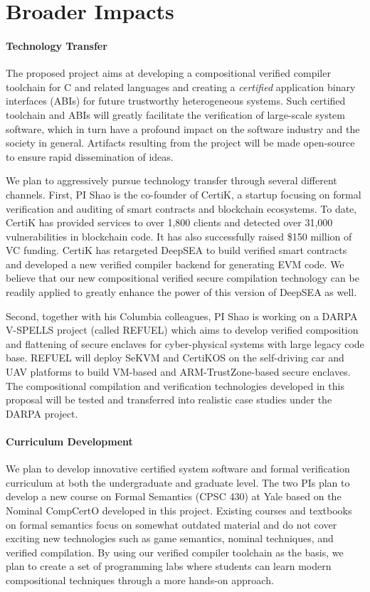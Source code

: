 \section{Broader Impacts}
\label{sec:impact}

\paragraph*{Technology Transfer}
The proposed project aims at developing a compositional verified
compiler toolchain for C and related languages and creating a {\em
  certified} application binary interfaces (ABIs) for future
trustworthy heterogeneous systems. Such certified toolchain and ABIs
will greatly facilitate the verification of large-scale system
software, which in turn have a profound impact on the software
industry and the society in general.
Artifacts resulting from the project will be
made open-source to ensure rapid dissemination of ideas.

We plan to aggressively pursue technology transfer through several
different channels. First, PI Shao is the co-founder of CertiK,
a startup focusing on formal verification and auditing of smart
contracts and blockchain ecosystems. To date,
CertiK has provided services to over 1,800 clients and detected
over 31,000 vulnerabilities in blockchain code. It has also
successfully raised \$150 million of VC funding. CertiK has retargeted
DeepSEA to build verified smart contracts and developed a new
verified compiler backend for generating EVM code. We believe
that our new compositional verified secure compilation technology
can be readily applied to greatly enhance the power of this version
of DeepSEA as well.

Second, together with his Columbia colleagues, PI Shao is working on
a DARPA V-SPELLS project (called REFUEL)
which aims to develop verified composition and flattening of secure
enclaves for cyber-physical systems with large legacy code base.
REFUEL will deploy SeKVM and CertiKOS on the self-driving car
and UAV platforms to build VM-based and ARM-TrustZone-based secure
enclaves. The compositional compilation and verification technologies
developed in this proposal will be tested and transferred into realistic
case studies under the DARPA project.

\vspace*{-2ex}
\paragraph*{Curriculum Development}
We plan to develop innovative certified system software and formal
verification curriculum at both the undergraduate and graduate
level. The two PIs plan to develop a new course on Formal Semantics
(CPSC 430) at Yale based on the Nominal CompCertO developed in this
project. Existing courses and textbooks on formal semantics focus on
somewhat outdated material and do not cover exciting new technologies
such as game semantics, nominal techniques, and verified
compilation. By using our verified compiler toolchain as the basis, we
plan to create a set of programming labs where students can learn
modern compositional techniques through a more hands-on approach.

